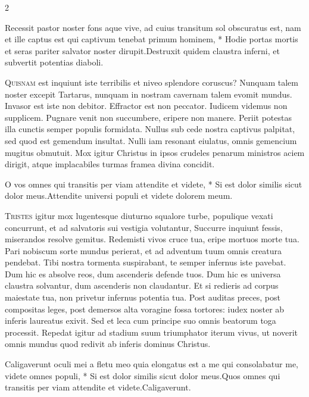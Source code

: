 \begin{multicols*}{2}
\begin{responsory}
{Recessit pastor noster fons aque vive, ad cuius transitum sol obscuratus est, nam et ille captus est qui captivum tenebat primum hominem, * Hodie portas mortis et seras pariter salvator noster dirupit.}{Destruxit quidem claustra inferni, et subvertit potentias diaboli.}
\end{responsory}%
\lettrine[lines=2]{\zallmancaps \color{Red} Q}{uisnam} est inquiunt iste terribilis et niveo splendore coruscus? Nunquam talem noster excepit Tartarus, nunquam in nostram cavernam talem evomit mundus. Invasor est iste non debitor. Effractor est non peccator. Iudicem videmus non supplicem. Pugnare venit non succumbere, eripere non manere. Periit potestas illa cunctis semper populis formidata. Nullus sub cede nostra captivus palpitat, sed quod est gemendum insultat. Nulli iam resonant eiulatus, omnis gemencium mugitus obmutuit. Mox igitur Christus in ipsos crudeles penarum ministros aciem dirigit, atque implacabiles turmas framea divina concidit.
\begin{responsory}
{O vos omnes qui transitis per viam attendite et videte, * Si est dolor similis sicut dolor meus.}{Attendite universi populi et videte dolorem meum.}
\end{responsory}%
\lettrine[lines=2]{\zallmancaps \color{Blue} T}{ristes} igitur mox lugentesque diuturno squalore turbe, populique vexati concurrunt, et ad salvatoris sui vestigia volutantur, Succurre inquiunt fessis, miserandos resolve gemitus. Redemisti vivos cruce tua, eripe mortuos morte tua. Pari nobiscum sorte mundus perierat, et ad adventum tuum omnis creatura pendebat. Tibi nostra tormenta suspirabant, te semper infernus iste pavebat. Dum hic es absolve reos, dum ascenderis defende tuos. Dum hic es universa claustra solvantur, dum ascenderis non claudantur. Et si redieris ad corpus maiestate tua, non privetur infernus potentia tua. Post auditas preces, post compositas leges, post demersos alta voragine fossa tortores: iudex noster ab inferis laureatus exivit. Sed et leca cum principe suo omnis beatorum toga processit. Repedat igitur ad stadium suum triumphator iterum vivus, ut noverit omnis mundus quod redivit ab inferis dominus Christus.
\begin{responsory}
{Caligaverunt oculi mei a fletu meo quia elongatus est a me qui consolabatur me, videte omnes populi, * Si est dolor similis sicut dolor meus.}{Quos omnes qui transitis per viam attendite et videte.}Caligaverunt.

\end{responsory}
\end{multicols*}
